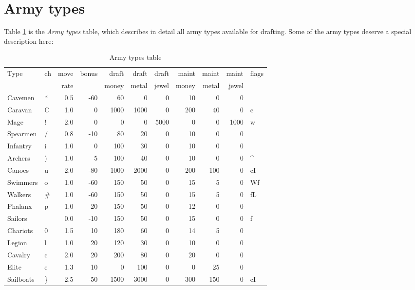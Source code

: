 \section{Army types}

Table \ref{tab-army-types} is the {\em Army types} table, which
describes in detail all army types available for drafting.  Some of
the army types deserve a special description here:

\begin{same}
\begin{table}[hbpt]
\caption{Army types table}
\label{tab-army-types}
\begin{tabular}{ || l | l | r | r | r | r | r | r | r | r | l || }
\hline
Type      &ch&move&bonus&draft&draft&draft&maint&maint&maint&flags \\
          &  &rate&     &money&metal&jewel&money&metal&jewel&      \\
\hline
Cavemen      &*& 0.5& -60 &  60 &   0 &   0 &  10 &   0 &   0 &\\
Caravan      &C& 1.0&   0 &1000 &1000 &   0 & 200 &  40 &   0 &c\\
Mage         &!& 2.0&   0 &   0 &   0 &5000 &   0 &   0 &1000 &w\\
Spearmen     &/& 0.8& -10 &  80 &  20 &   0 &  10 &   0 &   0 &\\
Infantry     &i& 1.0&   0 & 100 &  30 &   0 &  10 &   0 &   0 &\\
Archers      &)& 1.0&   5 & 100 &  40 &   0 &  10 &   0 &   0 &^\\
Canoes       &u& 2.0& -80 &1000 &2000 &   0 & 200 & 100 &   0 &cI\\
Swimmers     &o& 1.0& -60 & 150 &  50 &   0 &  15 &   5 &   0 &Wf\\
Walkers      &#& 1.0& -60 & 150 &  50 &   0 &  15 &   5 &   0 &fL\\
Phalanx      &p& 1.0&  20 & 150 &  50 &   0 &  12 &   0 &   0 &\\
Sailors      &~& 0.0& -10 & 150 &  50 &   0 &  15 &   0 &   0 &f\\
Chariots     &0& 1.5&  10 & 180 &  60 &   0 &  14 &   5 &   0 &\\
Legion       &l& 1.0&  20 & 120 &  30 &   0 &  10 &   0 &   0 &\\
Cavalry      &c& 2.0&  20 & 200 &  80 &   0 &  20 &   0 &   0 &\\
Elite        &e& 1.3&  10 &   0 & 100 &   0 &   0 &  25 &   0 &\\
Sailboats    &\}& 2.5& -50 &1500 &3000 &   0 & 300 & 150 &   0 &cI\\

\end{tabular}
\end{table}
\end{same}
